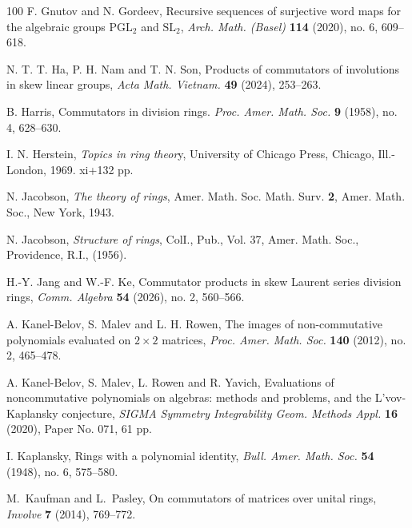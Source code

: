 \documentclass[11pt]{article}
\theoremstyle{definition}
\begin{document}
{{{{\begin{thebibliography}{100}
					 F. Gnutov and N. Gordeev,
					Recursive sequences of surjective word maps for the algebraic groups $\mathrm{PGL}_2$ and $\mathrm{SL}_2$,
					\textit{Arch. Math. (Basel)} \textbf{114} (2020), no. 6, 609--618.
					
					
					
					
					
					 N. T. T. Ha, P. H. Nam and T. N. Son, Products of commutators of involutions in skew linear groups, \emph{Acta Math. Vietnam.} \textbf{49} (2024), 253--263.
					
					 B. Harris,
					Commutators in division rings.
					\textit{Proc. Amer. Math. Soc.} \textbf{9} (1958), no. 4, 628--630.
					
					 I. N. Herstein,
					\textit{Topics in ring theor}y,
					University of Chicago Press, Chicago, Ill.-London, 1969. xi+132 pp.
					
					
					
					 N. Jacobson, \textit{The theory of rings}, Amer. Math. Soc. Math. Surv. \textbf{2}, Amer. Math. Soc., New York, 1943.
					
					 N. Jacobson, \textit{Structure of rings}, ColI., Pub., Vol. 37, Amer. Math. Soc., Providence, R.I., (1956).
					
					 H.-Y. Jang and W.-F. Ke, Commutator products in skew Laurent series division rings, \textit{Comm. Algebra} \textbf{54} (2026), no. 2, 560--566.
					
					
					 A. Kanel-Belov, S. Malev and L. H. Rowen, The images of non-commutative polynomials evaluated on $2\times2$ matrices, \textit{Proc. Amer. Math. Soc.} \textbf{140} (2012), no. 2, 465--478.
					
					 A. Kanel-Belov, S.  Malev, L. Rowen and R. Yavich,
					Evaluations of noncommutative polynomials on algebras: methods and problems, and the L'vov-Kaplansky conjecture,
					\textit{SIGMA Symmetry Integrability Geom. Methods Appl.} \textbf{16} (2020), Paper No. 071, 61 pp.
					
					  I. Kaplansky, Rings with a polynomial identity, \textit{Bull. Amer. Math. Soc.} \textbf{54} (1948), no. 6, 575--580.
					
					M.~Kaufman and L.~Pasley,
					On commutators of matrices over unital rings,  \emph{Involve} \textbf{7}
					(2014), 769--772.
					

\end{thebibliography}}}}}
\end{document}
